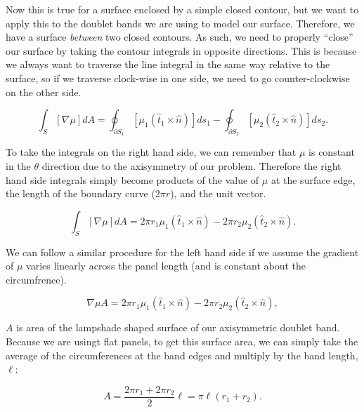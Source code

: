 Now this is true for a surface enclosed by a simple closed contour, but we want to apply this to the doublet bands we are using to model our surface.
Therefore, we have a surface \textit{between} two closed contours.
As such, we need to properly ``close'' our surface by taking the contour integrals in opposite directions.
This is because we always want to traverse the line integral in the same way relative to the surface, so if we traverse clock-wise in one side, we need to go counter-clockwise on the other side.

\begin{equation}
    \int_S \left[\nabla \mu \right] dA = \oint_{\partial S_1} \left[\mu_1 (\hat{t}_1 \times \hat{n})\right] ds_1 - \oint_{\partial S_2} \left[\mu_2 (\hat{t}_2 \times \hat{n})\right] ds_2.
\end{equation}

To take the integrals on the right hand side, we can remember that \(\mu\) is constant in the \(\theta\) direction due to the axisymmetry of our problem.
Therefore the right hand side integrals simply become products of the value of \(\mu\) at the surface edge, the length of the boundary curve (\(2\pi r\)), and the unit vector.

\begin{equation}
    \int_S \left[\nabla \mu \right] dA = 2 \pi r_1 \mu_1 (\hat{t}_1 \times \hat{n}) - 2 \pi r_2 \mu_2 (\hat{t}_2 \times \hat{n}).
\end{equation}

\noindent We can follow a similar procedure for the left hand side if we assume the gradient of \(\mu\) varies linearly across the panel length (and is constant about the circumfrence).

\begin{equation}
    \nabla \mu A = 2 \pi r_1 \mu_1 (\hat{t}_1 \times \hat{n}) - 2 \pi r_2 \mu_2 (\hat{t}_2 \times \hat{n}),
\end{equation}

\where \(A\) is area of the lampshade shaped surface of our axisymmetric doublet band.
Because we are usingt flat panels, to get this surface area, we can simply take the average of the circumferences at the band edges and multiply by the band length, \(\ell\):

\begin{equation}
    A = \frac{2\pi r_1 + 2 \pi r_2}{2} \ell = \pi\ell(r_1 + r_2).
\end{equation}


